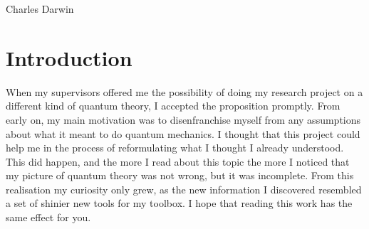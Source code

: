 \documentclass[10pt, a4paper, singlespacing, headsepline]{report}
\begin{document}
\vspace*{0.2\textheight}

\bigbreak

\hfill Charles Darwin

\vspace{20cm}


\tableofcontents %

\vspace{20cm}

\listoffigures %

\vspace{20cm}





\begin{abstract}\label{Abstract}
\blindtext
\end{abstract}

\chapter{Introduction}\label{Introduction}
When my supervisors offered me the possibility of doing my research project on a different kind of quantum theory, I accepted the proposition promptly. 
From early on, my main motivation was to disenfranchise myself from any assumptions about what it meant to do quantum mechanics. I thought that this project could help me in the process of reformulating what I thought I already understood. This did happen, and the more I read about this topic the more I noticed that my picture of quantum theory was not wrong, but it was incomplete. From this realisation my curiosity only grew, as the new information I discovered resembled a set of shinier new tools for my toolbox. I hope that reading this work has the same effect for you.
\end{document}
